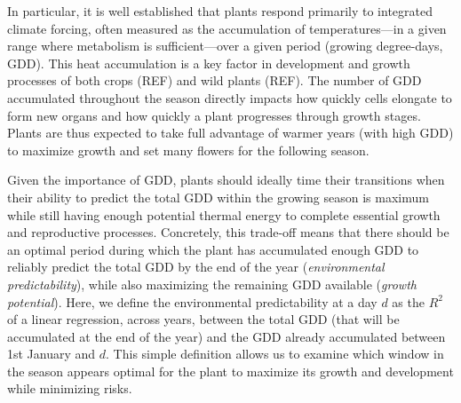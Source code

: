 \documentclass[11pt,letter]{article}
\begin{document}
In particular, it is well established that plants respond primarily to integrated climate forcing, often measured as the accumulation of temperatures---in a given range where metabolism is sufficient---over a given period (growing degree-days, GDD). This heat accumulation is a key factor in development and growth processes of both crops (REF) and wild plants (REF). The number of GDD accumulated throughout the season directly impacts how quickly cells elongate to form new organs and how quickly a plant progresses through growth stages. Plants are thus expected to take full advantage of warmer years (with high GDD) to maximize growth and set many flowers for the following season.

Given the importance of GDD, plants should ideally time their transitions when their ability to predict the total GDD within the growing season is maximum while still having enough potential thermal energy to complete essential growth and reproductive processes. Concretely, this trade-off means that there should be an optimal period during which the plant has accumulated enough GDD to reliably predict the total GDD by the end of the year (\emph{environmental predictability}), while also maximizing the remaining GDD available (\emph{growth potential}). Here, we define the environmental predictability at a day $d$ as the $R^2$ of a linear regression, across years, between the total GDD (that will be accumulated at the end of the year) and the GDD already accumulated between 1st January and $d$. This simple definition allows us to examine which window in the season appears optimal for the plant to maximize its growth and development while minimizing risks.
\end{document}
